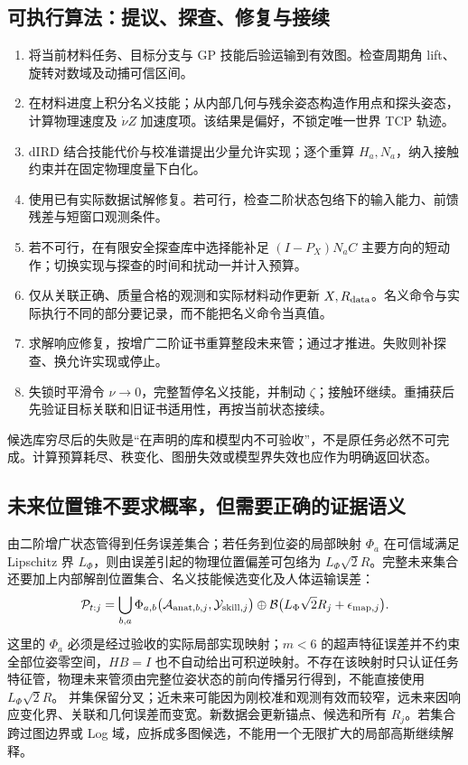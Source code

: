 \documentclass[11pt,a4paper]{article}
\numberwithin{equation}{section}
\theoremstyle{definition}
\begin{document}
\subsection{可执行算法：提议、探查、修复与接续}
\begin{enumerate}
 \item 将当前材料任务、目标分支与 GP 技能后验运输到有效图。检查周期角 lift、旋转对数域及动捕可信区间。
 \item 在材料进度上积分名义技能；从内部几何与残余姿态构造作用点和探头姿态，计算物理速度及 $\dot\nu Z$ 加速度项。该结果是偏好，不锁定唯一世界 TCP 轨迹。
 \item dIRD 结合技能代价与校准谱提出少量允许实现；逐个重算 $H_a,N_a$，纳入接触约束并在固定物理度量下白化。
 \item 使用已有实际数据试解修复。若可行，检查二阶状态包络下的输入能力、前馈残差与短窗口观测条件。
 \item 若不可行，在有限安全探查库中选择能补足 $(I-P_X)N_aC$ 主要方向的短动作；切换实现与探查的时间和扰动一并计入预算。
 \item 仅从关联正确、质量合格的观测和实际材料动作更新 $X,R_{\rm data}$。名义命令与实际执行不同的部分要记录，而不能把名义命令当真值。
 \item 求解响应修复，按增广二阶证书重算整段未来管；通过才推进。失败则补探查、换允许实现或停止。
 \item 失锁时平滑令 $\nu\to0$，完整暂停名义技能，并制动 $\zeta$；接触环继续。重捕获后先验证目标关联和旧证书适用性，再按当前状态接续。
\end{enumerate}
候选库穷尽后的失败是“在声明的库和模型内不可验收”，不是原任务必然不可完成。计算预算耗尽、秩变化、图册失效或模型界失效也应作为明确返回状态。

\subsection{未来位置锥不要求概率，但需要正确的证据语义}
由二阶增广状态管得到任务误差集合；若任务到位姿的局部映射 $\Phi_a$ 在可信域满足 Lipschitz 界 $L_\Phi$，则由误差引起的物理位置偏差可包络为 $L_\Phi\sqrt2 R$。完整未来集合还要加上内部解剖位置集合、名义技能候选变化及人体运输误差：
\begin{equation}
 \mathcal P_{t:j}=\bigcup_{b,a}\Phi_{a,b}\bigl(\mathcal A_{{\rm anat},b,j},\mathcal Y_{{\rm skill},j}\bigr)
 \oplus\mathcal B\bigl(L_\Phi\sqrt2 R_j+\epsilon_{{\rm map},j}\bigr).
\end{equation}
这里的 $\Phi_a$ 必须是经过验收的实际局部实现映射；$m<6$ 的超声特征误差并不约束全部位姿零空间，$HB=I$ 也不自动给出可积逆映射。不存在该映射时只认证任务特征管，物理未来管须由完整位姿状态的前向传播另行得到，不能直接使用 $L_\Phi\sqrt2 R$。
并集保留分叉；近未来可能因为刚校准和观测有效而较窄，远未来因响应变化界、关联和几何误差而变宽。新数据会更新锚点、候选和所有 $R_j$。若集合跨过图边界或 Log 域，应拆成多图候选，不能用一个无限扩大的局部高斯继续解释。
\end{document}
